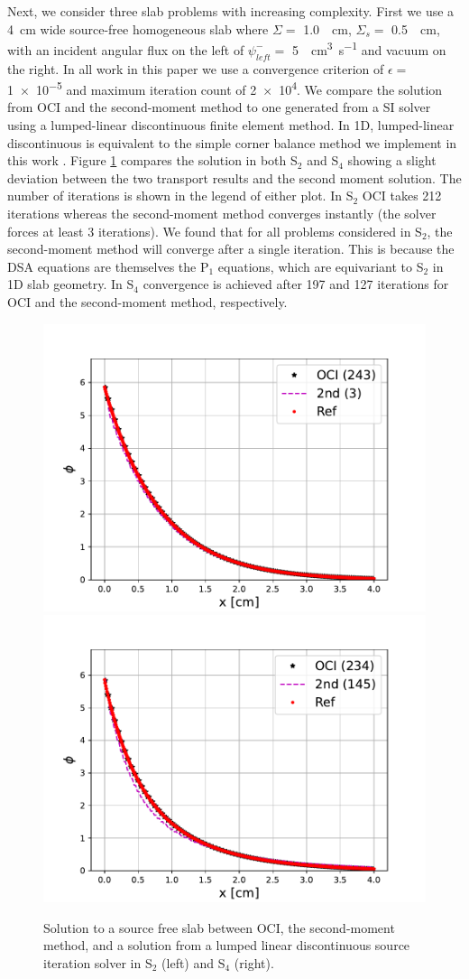 Next, we consider three slab problems with increasing complexity.
First we use a \SI{4}{\centi\meter} wide source-free homogeneous slab where $\Sigma=$ \SI{1.0}{\per\centi\meter}, $\Sigma_s=$ \SI{0.5}{\per\centi\meter}, with an incident angular flux on the left of $\psi_{left}^-=$ \SI{5}{\per\centi\meter\cubed\per\s} and vacuum on the right.
In all work in this paper we use a convergence criterion of $\epsilon = $ \num{1e-5} and maximum iteration count of \num{2e4}.
We compare the solution from OCI and the second-moment method to one generated from a SI solver using a lumped-linear discontinuous finite element method.
In 1D, lumped-linear discontinuous is equivalent to the simple corner balance method we implement in this work \cite{adams_subcell_1997}.
Figure \ref{fig:regression_slab} compares the solution in both S$_2$ and S$_4$ showing a slight deviation between the two transport results and the second moment solution.
The number of iterations is shown in the legend of either plot.
In S$_2$ OCI takes 212 iterations whereas the second-moment method converges instantly (the solver forces at least 3 iterations).
We found that for all problems considered in S$_2$, the second-moment method will converge after a single iteration.
This is because the DSA equations are themselves the P$_1$ equations, which are equivariant to S$_2$ in 1D slab geometry.
In S$_4$ convergence is achieved after \num{197} and \num{127} iterations for OCI and the second-moment method, respectively.

\begin{figure}
    \centering
    \includegraphics[width=.49\linewidth]{figures/smm_paper/regression_slabs2.pdf}
    \includegraphics[width=.49\linewidth]{figures/smm_paper/regression_slabs4.pdf}
    \caption{Solution to a source free slab between OCI, the second-moment method, and a solution from a lumped linear discontinuous source iteration solver in S$_2$ (left) and S$_4$ (right).}
    \label{fig:regression_slab}
\end{figure}
 
